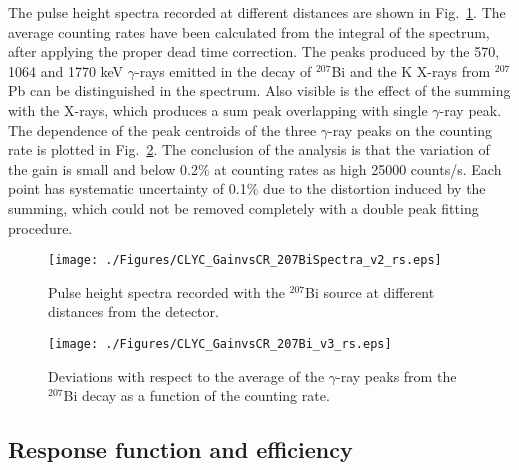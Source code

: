 \documentclass[review,number,sort&compress]{elsarticle}
\begin{document}
The pulse height spectra recorded at different distances are shown in Fig.~\ref{spc_crate}. The average counting rates have been calculated from the integral of the spectrum, after applying the proper dead time correction. The peaks produced by the 570, 1064 and 1770 keV $\gamma$-rays emitted in the decay of $^{207}$Bi and the K X-rays from $^{207}$Pb can be distinguished in the spectrum. Also visible is the effect of the summing with the X-rays, which produces a sum peak overlapping with single $\gamma$-ray peak. The dependence of the peak centroids of the three $\gamma$-ray peaks on the counting rate is plotted in Fig.~\ref{crate}. The conclusion of the analysis is that the variation of the gain is small and below 0.2$\%$ at counting rates as high 25000 counts/s. Each point has systematic uncertainty of 0.1$\%$ due to the distortion induced by the summing, which could not be removed completely with a double peak fitting procedure.
  
\begin{figure}[h!]
\centering
\texttt{[image: ./Figures/CLYC\_GainvsCR\_207BiSpectra\_v2\_rs.eps]}
\caption{Pulse height spectra recorded with the $^{207}$Bi source at different distances from the detector.}
\label{spc_crate}
\end{figure}

\begin{figure}[h!]
\centering
\texttt{[image: ./Figures/CLYC\_GainvsCR\_207Bi\_v3\_rs.eps]}
\caption{Deviations with respect to the average of the $\gamma$-ray peaks from the $^{207}$Bi decay as a function of the counting rate. }
\label{crate}
\end{figure}


\subsection{Response function and efficiency}
\end{document}
